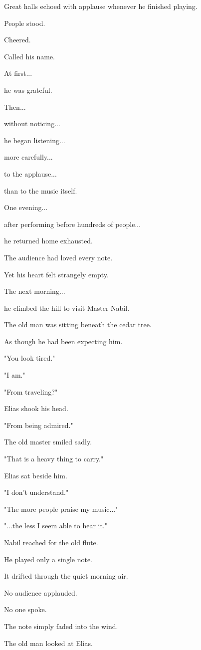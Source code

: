 \documentclass[12pt,openany]{book}
\begin{document}
Great halls echoed with applause whenever he finished playing.

People stood.

Cheered.

Called his name.

At first...

he was grateful.

Then...

without noticing...

he began listening...

more carefully...

to the applause...

than to the music itself.

One evening...

after performing before hundreds of people...

he returned home exhausted.

The audience had loved every note.

Yet his heart felt strangely empty.

The next morning...

he climbed the hill to visit Master Nabil.

The old man was sitting beneath the cedar tree.

As though he had been expecting him.

"You look tired."

"I am."

"From traveling?"

Elias shook his head.

"From being admired."

The old master smiled sadly.

"That is a heavy thing to carry."

Elias sat beside him.

"I don't understand."

"The more people praise my music..."

"...the less I seem able to hear it."

Nabil reached for the old flute.

He played only a single note.

It drifted through the quiet morning air.

No audience applauded.

No one spoke.

The note simply faded into the wind.

The old man looked at Elias.
\end{document}
